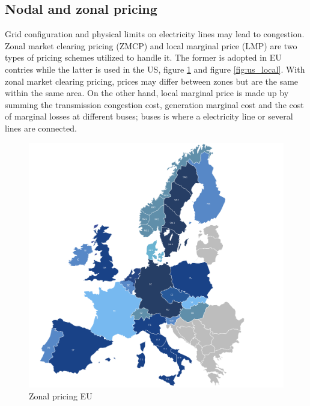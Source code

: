\subsection{Nodal and zonal pricing}
Grid configuration and physical limits on electricity lines may lead to congestion. Zonal market clearing pricing (ZMCP) and local marginal price (LMP) are two types of pricing schemes utilized to handle it. The former is adopted in EU contries while the latter is used in the US, figure \ref{fig:eu_zonal} and figure \ref{fig:us_local}.
With zonal market clearing pricing, prices may differ between zones but are the same within the same area.
On the other hand, local marginal price is made up by summing the transmission congestion cost, generation marginal cost and the cost of marginal losses at different buses; buses is where a electricity line or several lines are connected.
\begin{figure}[!h]
    \includegraphics[width=\textwidth]{images/eu_zonal.png}
    \caption[Zonal pricing EU]{Zonal pricing EU }
    \label{fig:eu_zonal}
\end{figure}


